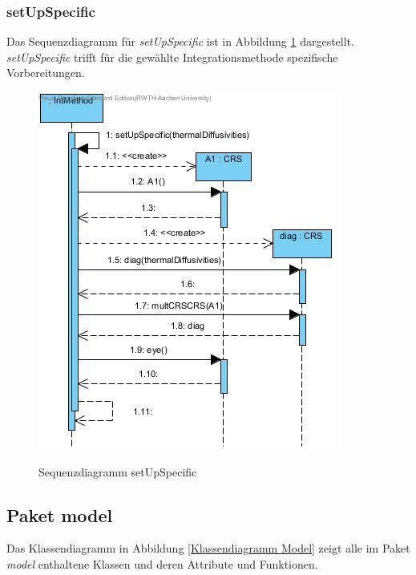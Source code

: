 \subsubsection*{setUpSpecific}

Das Sequenzdiagramm für \emph{setUpSpecific} ist in Abbildung \ref{Sequenzdiagramm setUpSpecific} dargestellt. \emph{setUpSpecific} trifft für die gewählte Integrationsmethode spezifische Vorbereitungen.

\begin{figure}[H]
	\centering
	\includegraphics[scale=.6]{Bilder/IntMethod__setUpSpecific().jpg}\\
	\caption{Sequenzdiagramm setUpSpecific}
	\label{Sequenzdiagramm setUpSpecific}
\end{figure}

\newpage
\subsection{Paket model}

Das Klassendiagramm in Abbildung \ref{Klassendiagramm Model} zeigt alle im Paket \emph{model} enthaltene Klassen und deren Attribute und Funktionen.

